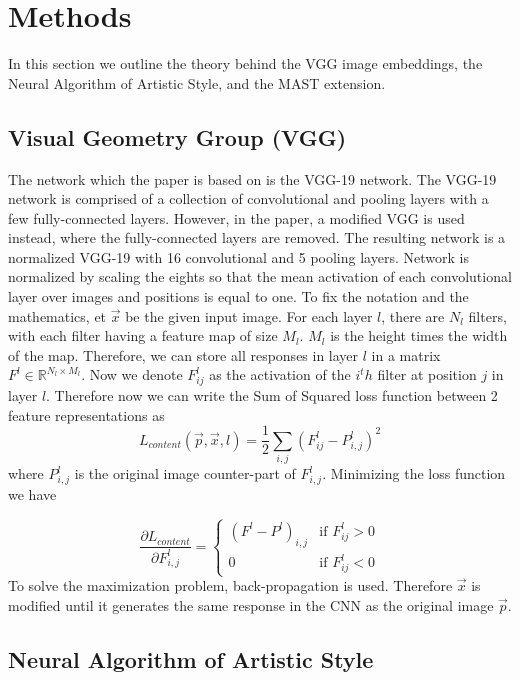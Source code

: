 \documentclass{article}
\begin{document}
\section{Methods}

In this section we outline the theory behind the VGG image embeddings, the Neural Algorithm of Artistic Style, and the MAST extension.

\subsection{Visual Geometry Group (VGG)}

The network which the paper is based on is the VGG-19 network. The VGG-19 network is comprised of a collection of convolutional and pooling layers with a few fully-connected layers. However, in the paper, a modified VGG is used instead, where the fully-connected layers are removed. The resulting network is a normalized VGG-19 with 16 convolutional and 5 pooling layers. Network is normalized by scaling the eights so that the mean activation of each convolutional layer over images and positions is equal to one. 
To fix the notation and the mathematics, et $\vec{x}$ be the given input image. For each layer $l$, there are $N_l$ filters, with each filter having a feature map of size $M_l$. $M_l$ is the height times the width of the map. Therefore, we can store all responses in layer $l$ in a matrix $F^l \in \mathbb{R}^{N_l \times M_l}$. Now we denote $F_{ij}^l$ as the activation of the $i^th$ filter at position $j$ in layer $l$. Therefore now we can write the Sum of Squared loss function between 2 feature representations as 
$$
L_{content}(\vec{p}, \vec{x}, l) = \frac{1}{2}\sum_{i,j} \left(F^l_{ij} - P^l_{i,j}\right)^2
$$
where $P^l_{i,j}$ is the original image counter-part of $F^l_{i,j}$. Minimizing the loss function we have 

$$
\frac{\partial L_{content}}{\partial F^l_{i,j}} = 
\begin{cases}
(F^l - P^l)_{i,j} &\text{if $F^l_{ij} > 0$} \\
0 &\text{if $F^l_{ij} < 0$}
\end{cases}
$$
To solve the maximization problem, back-propagation is used. Therefore $\vec{x}$ is modified until it generates the same response in the CNN as the original image $\vec{p}$. 

\subsection{Neural Algorithm of Artistic Style}
\end{document}
